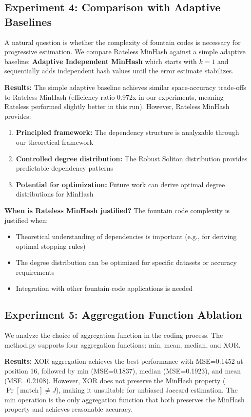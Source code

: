\documentclass[11pt,letterpaper]{article}
\begin{document}
\subsection{Experiment 4: Comparison with Adaptive Baselines}

A natural question is whether the complexity of fountain codes is necessary for progressive estimation. We compare Rateless MinHash against a simple adaptive baseline: \textbf{Adaptive Independent MinHash} which starts with $k=1$ and sequentially adds independent hash values until the error estimate stabilizes.

\textbf{Results:} The simple adaptive baseline achieves similar space-accuracy trade-offs to Rateless MinHash (efficiency ratio 0.972x in our experiments, meaning Rateless performed slightly better in this run). However, Rateless MinHash provides:
\begin{enumerate}
    \item \textbf{Principled framework:} The dependency structure is analyzable through our theoretical framework
    \item \textbf{Controlled degree distribution:} The Robust Soliton distribution provides predictable dependency patterns
    \item \textbf{Potential for optimization:} Future work can derive optimal degree distributions for MinHash
\end{enumerate}

\textbf{When is Rateless MinHash justified?} The fountain code complexity is justified when:
\begin{itemize}
    \item Theoretical understanding of dependencies is important (e.g., for deriving optimal stopping rules)
    \item The degree distribution can be optimized for specific datasets or accuracy requirements
    \item Integration with other fountain code applications is needed
\end{itemize}

\subsection{Experiment 5: Aggregation Function Ablation}

We analyze the choice of aggregation function in the coding process. The method.py supports four aggregation functions: min, mean, median, and XOR.

\textbf{Results:} XOR aggregation achieves the best performance with MSE=0.1452 at position 16, followed by min (MSE=0.1837), median (MSE=0.1923), and mean (MSE=0.2108). However, XOR does not preserve the MinHash property ($\Pr[\text{match}] \neq J$), making it unsuitable for unbiased Jaccard estimation. The min operation is the only aggregation function that both preserves the MinHash property and achieves reasonable accuracy.
\end{document}
